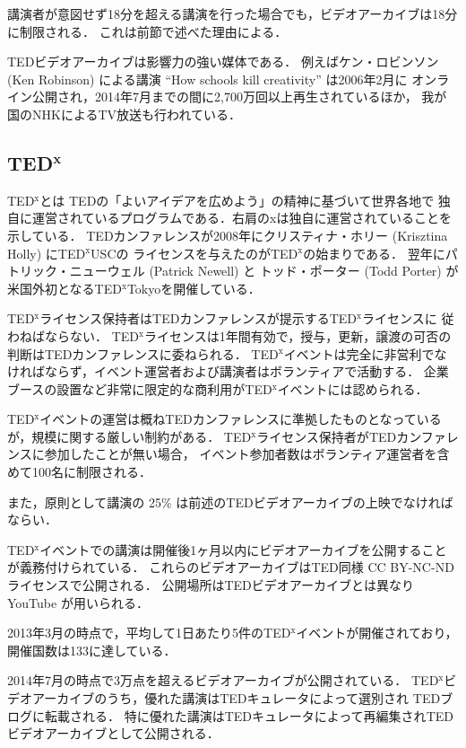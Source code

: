 \documentclass[submit,techreq,jkeyword,noauthor]{ipsj}
\newcommand{\TED}{\textrm{TED}}
\newcommand{\TEDx}{\TED${}^{\textrm{x}}$}
\newcommand{\TEDxTokyo}{\TEDx\textrm{Tokyo}}
\newcommand{\TEDxUSC}{\TEDx\textrm{USC}}
\newcommand{\TEDtitle}{\textbf{TED}}
\newcommand{\TEDxtitle}{\TEDtitle${}^{\textbf{x}}$}
\begin{document}
講演者が意図せず18分を超える講演を行った場合でも，ビデオアーカイブは18分に制限される．
これは前節で述べた理由による．

\TED ビデオアーカイブは影響力の強い媒体である．
例えばケン・ロビンソン (Ken Robinson) による講演 ``How schools kill creativity'' は2006年2月に
オンライン公開され，2014年7月までの間に2,700万回以上再生されているほか，
我が国のNHKによるTV放送も行われている．\cite{kr}


\subsection{\TEDxtitle}

\TEDx とは \TED の「よいアイデアを広めよう」の精神に基づいて世界各地で
独自に運営されているプログラムである．右肩のxは独自に運営されていることを示している．
\TED カンファレンスが2008年にクリスティナ・ホリー (Krisztina Holly) に\TEDxUSC の
ライセンスを与えたのが\TEDx の始まりである．
翌年にパトリック・ニューウェル (Patrick Newell) と
トッド・ポーター (Todd Porter) が米国外初となる\TEDxTokyo を開催している．\cite{tedxusc}

\TEDx ライセンス保持者は\TED カンファレンスが提示する\TEDx ライセンス\cite{tedxrules}に
従わねばならない．
\TEDx ライセンスは1年間有効で，授与，更新，譲渡の可否の判断は\TED カンファレンスに委ねられる．
\TEDx イベントは完全に非営利でなければならず，イベント運営者および講演者はボランティアで活動する．
企業ブースの設置など非常に限定的な商利用が\TEDx イベントには認められる．

\TEDx イベントの運営は概ね\TED カンファレンスに準拠したものとなっているが，規模に関する厳しい制約がある．
\TEDx ライセンス保持者が\TED カンファレンスに参加したことが無い場合，
イベント参加者数はボランティア運営者を含めて100名に制限される．

また，原則として講演の 25\% は前述の\TED ビデオアーカイブの上映でなければならい．

\TEDx イベントでの講演は開催後1ヶ月以内にビデオアーカイブを公開することが義務付けられている．
これらのビデオアーカイブは\TED 同様 CC BY-NC-ND ライセンスで公開される．
公開場所は\TED ビデオアーカイブとは異なり YouTube が用いられる．


2013年3月の時点で，平均して1日あたり5件の\TEDx イベントが開催されており，
開催国数は133に達している．\cite{nh,mf}

2014年7月の時点で3万点を超えるビデオアーカイブが公開されている．
\TEDx ビデオアーカイブのうち，優れた講演は\TED キュレータによって選別され \TED ブログに転載される．
特に優れた講演は\TED キュレータによって再編集され\TED ビデオアーカイブとして公開される．\cite{tedxtalksweb}
\end{document}
